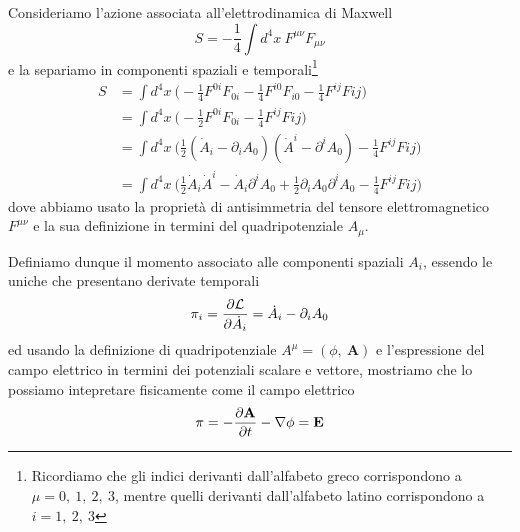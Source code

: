     Consideriamo l'azione associata all'elettrodinamica di Maxwell
    \begin{equation*}
        S = - \frac{1}{4} \int d^4 x ~ F^{\mu\nu} F_{\mu\nu}
    \end{equation*}
    e la separiamo in componenti spaziali e temporali\footnote{Ricordiamo che gli indici derivanti dall'alfabeto greco corrispondono a $\mu = 0, ~1, ~2, ~3$, mentre quelli derivanti dall'alfabeto latino corrispondono a $i = 1, ~2, ~3$}
    \begin{equation*}
    \begin{aligned}
        S & = \int d^4 x ~ \Big ( -\frac{1}{4} F^{0i}F_{0i} - \frac{1}{4} F^{i0}F_{i0} - \frac{1}{4} F^{ij} F{ij} \Big) \\ & = \int d^4 x ~ \Big ( -\frac{1}{2} F^{0i}F_{0i} - \frac{1}{4} F^{ij} F{ij} \Big) \\ & = \int d^4 x ~ \Big( \frac{1}{2} (\dot A_i - \partial_i A_0) (\dot A^i - \partial^i A_0) - \frac{1}{4} F^{ij} F{ij} \Big ) \\ & = \int d^4 x ~ \Big (\frac{1}{2} \dot A_i \dot A^i - \dot A_i \partial^i A_0 + \frac{1}{2} \partial_i A_0 \partial^i A_0 - \frac{1}{4} F^{ij} F{ij} \Big )
    \end{aligned}
    \end{equation*}
    dove abbiamo usato la proprietà di antisimmetria del tensore elettromagnetico $F^{\mu\nu}$ e la sua definizione in termini del quadripotenziale $A_\mu$.

    Definiamo dunque il momento associato alle componenti spaziali $A_i$, essendo le uniche che presentano derivate temporali
    \begin{equation} \label{momele}
        \pi_i = \frac{\partial\mathcal L}{\partial\dot A_i} = \dot A_i - \partial_i A_0
    \end{equation}
    ed usando la definizione di quadripotenziale $A^\mu = (\phi, ~ \mathbf A)$ e l'espressione del campo elettrico in termini dei potenziali scalare e vettore, mostriamo che lo possiamo intepretare fisicamente come il campo elettrico
    \begin{equation*}
        \mathbf \pi = - \frac{\partial\mathbf A}{\partial t} - \nabla \phi = \mathbf E
    \end{equation*}
    
